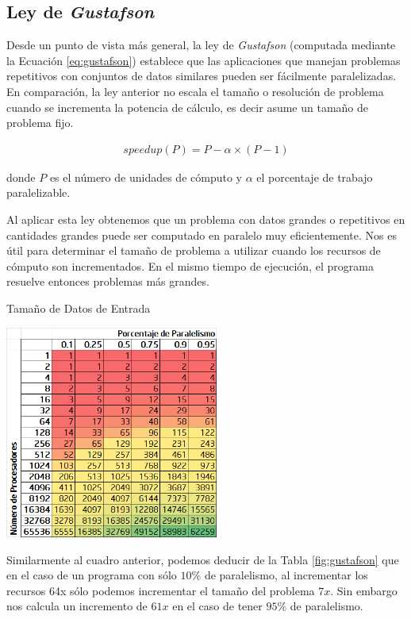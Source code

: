 \documentclass[a4paper]{report}
\begin{document}
\subsection{Ley de {\it Gustafson}}

Desde un punto de vista más general, la ley de {\it Gustafson}
\cite{gustafson} (computada mediante la Ecuación \ref{eq:gustafson})
establece que las aplicaciones que manejan problemas
repetitivos con conjuntos de datos similares pueden ser fácilmente
paralelizadas. En comparación, la ley anterior no escala el tamaño o
resolución de problema cuando se incrementa la potencia de cálculo, es
decir asume un tamaño de problema fijo. 

\begin{eqnarray}
\label{eq:gustafson}
speedup(P) = P - \alpha \times ( P - 1)
\end{eqnarray}

donde $ P $ es el número de unidades de cómputo y $ \alpha $ el porcentaje de trabajo paralelizable.

\bigskip

Al aplicar esta ley obtenemos que un problema con datos grandes o repetitivos en cantidades grandes puede ser computado en paralelo muy eficientemente. Nos es útil para determinar el tamaño de problema a utilizar cuando los recursos de cómputo son incrementados. En el mismo tiempo de ejecución, el programa resuelve entonces problemas más grandes.

\begin{table}[H]
\caption{Tamaño de Datos de Entrada}
\centering
\includegraphics[width=7cm]{gustafson.png}
\label{fig:gustafson}
\end{table}

Similarmente al cuadro anterior, podemos deducir de la Tabla \ref{fig:gustafson} que en el caso de un programa con sólo $ 10\% $ de paralelismo, al incrementar los recursos 64x sólo podemos incrementar el tamaño del problema $ 7x $. Sin embargo nos calcula
un incremento de $ 61x $ en el caso de tener $ 95\% $ de paralelismo.
\end{document}
